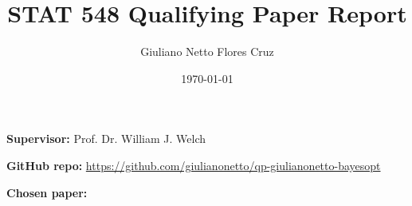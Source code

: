 \documentclass[12pt]{article}
\title{STAT 548 Qualifying Paper Report} %
\author{Giuliano Netto Flores Cruz} %
\date{\today} %
\begin{document}
\maketitle

\vspace{5mm}

\begin{flushleft}
{\large \textbf{Supervisor:} Prof. Dr. William J. Welch}

\vspace{5mm}

{\large \textbf{GitHub repo:}} \href{https://github.com/giulianonetto/qp-giulianonetto-bayesopt}{https://github.com/giulianonetto/qp-giulianonetto-bayesopt}
\vspace{5mm}

{\large \textbf{Chosen paper:}}
\vspace{2mm}


\end{flushleft}







\newpage

\end{document}
